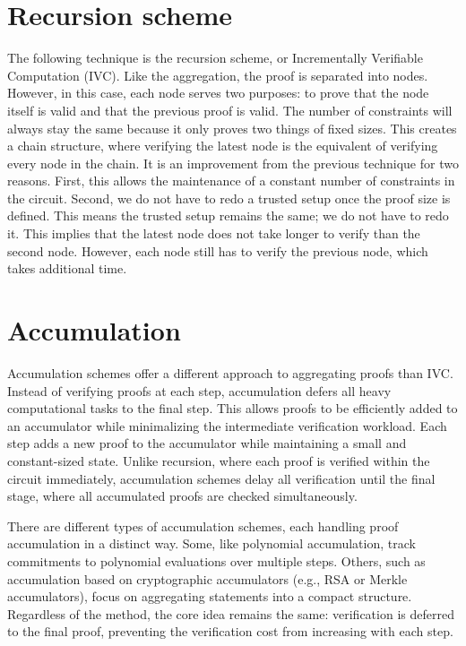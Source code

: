 \section{Recursion scheme}
The following technique is the recursion scheme, or Incrementally Verifiable Computation (IVC). Like the aggregation, the proof is separated into nodes.
However, in this case, each node serves two purposes: to prove that the node itself is valid and that the previous proof is valid.
The number of constraints will always stay the same because it only proves two things of fixed sizes. This creates
a chain structure, where verifying the latest node is the equivalent of verifying every node in the chain.
It is an improvement from the previous technique for two reasons.
First, this allows the maintenance of a constant number of constraints in the circuit.
Second, we do not have to redo a trusted setup once the proof size is defined.
This means the trusted setup remains the same; we do not have to redo it.
This implies that the latest node does not take longer to verify than the second node.
However, each node still has to verify the previous node, which takes additional time. \cite{Nova23}


\section{Accumulation}
Accumulation schemes offer a different approach to aggregating proofs than IVC. 
Instead of verifying proofs at each step, accumulation defers all heavy computational tasks to the final step.
This allows proofs to be efficiently added to an accumulator while minimalizing the intermediate verification workload. 
Each step adds a new proof to the accumulator while maintaining a small and constant-sized state. 
Unlike recursion, where each proof is verified within the circuit immediately, accumulation schemes delay all verification until the final stage, 
where all accumulated proofs are checked simultaneously.

There are different types of accumulation schemes, each handling proof accumulation in a distinct way.
Some, like polynomial accumulation, track commitments to polynomial evaluations over multiple steps. 
Others, such as accumulation based on cryptographic accumulators (e.g., RSA or Merkle accumulators), focus on aggregating statements into a compact structure. 
Regardless of the method, the core idea remains the same: verification is deferred to the final proof, preventing the verification cost from increasing with each step.

